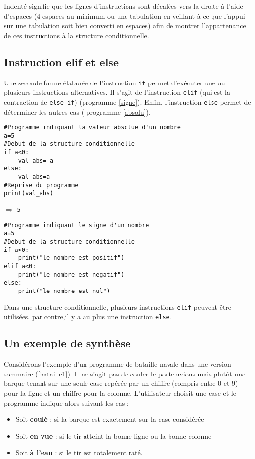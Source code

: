 Indenté signifie que les lignes d'instructions sont décalées vers la droite à l'aide d'espaces (4 espaces au minimum ou une tabulation en veillant à ce que l'appui sur une tabulation soit bien converti en espaces) afin de montrer l'appartenance de ces instructions à la structure conditionnelle.


\subsection{Instruction elif et else}

Une seconde forme élaborée de l'instruction \verb|if| permet d'exécuter une ou plusieurs instructions alternatives. Il s'agit de l'instruction \verb|elif| (qui est la contraction de \verb|else if|) (programme \ref{signe}). Enfin, l'instruction \verb|else| permet de déterminer les autres cas ( programme \ref{absolu}).

\begin{lstlisting}[frame=lines,caption={Valeur absolue},label=absolu]
#Programme indiquant la valeur absolue d'un nombre
a=5
#Debut de la structure conditionnelle
if a<0:
    val_abs=-a
else:
    val_abs=a
#Reprise du programme    
print(val_abs)
\end{lstlisting}
$\Rightarrow$ \verb|5|

\begin{lstlisting}[frame=lines,caption={Signe d'un nombre},label=signe]
#Programme indiquant le signe d'un nombre
a=5
#Debut de la structure conditionnelle
if a>0:
    print("le nombre est positif")
elif a<0:
    print("le nombre est negatif")
else:
    print("le nombre est nul")
\end{lstlisting}


Dans une structure conditionnelle, plusieurs instructions \verb|elif| peuvent être utilisées. par contre,il y a au plus une instruction \verb|else|.

\subsection{Un exemple de synthèse }

Considérons l'exemple d'un programme de bataille navale dans une version sommaire (\ref{bataille1}). Il ne s'agit pas de couler le porte-avions mais plutôt une barque tenant sur une seule case repérée par un chiffre (compris entre 0 et 9) pour la ligne et un chiffre pour la colonne. L'utilisateur choisit une case et le programme indique alors suivant les cas :
\begin{itemize}
	\item Soit \textbf{coulé} : si la barque est exactement sur la case considérée
	\item Soit \textbf{en vue} : si le tir atteint la bonne ligne ou la bonne colonne.
	\item Soit \textbf{à l'eau} : si le tir est totalement raté.
\end{itemize}

